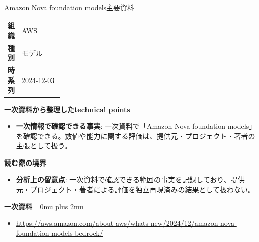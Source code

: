 \begin{technicalnote}{Amazon Nova foundation models}{主要資料}
\begingroup
\begin{tabularx}{\linewidth}{@{}>{\bfseries}p{0.22\linewidth}X@{}}
組織 & AWS \\
種別 & モデル \\
時系列 & 2024-12-03 \\
\end{tabularx}
\smallskip
{\bfseries 一次資料から整理したtechnical points}
\begin{itemize}[leftmargin=1.5em,itemsep=0.35em]
\item \textbf{一次情報で確認できる事実}: 一次資料で「Amazon Nova foundation models」を確認できる。数値や能力に関する評価は、提供元・プロジェクト・著者の主張として扱う。
\end{itemize}
\begin{minipage}{\linewidth}
{\bfseries 読む際の境界}
\begin{itemize}[leftmargin=1.5em,itemsep=0.35em]
\item \textbf{分析上の留意点}: 一次資料で確認できる範囲の事実を記録しており、提供元・プロジェクト・著者による評価を独立再現済みの結果として扱わない。
\end{itemize}
\begin{samepage}
{\bfseries 一次資料}
\begingroup\sloppy
\Urlmuskip=0mu plus 2mu\relax
\begin{itemize}[leftmargin=1.5em,itemsep=0.25em]
\item {\scriptsize\url{https://aws.amazon.com/about-aws/whats-new/2024/12/amazon-nova-foundation-models-bedrock/}}
\end{itemize}
\endgroup
\end{samepage}
\end{minipage}
\endgroup
\end{technicalnote}
\medskip

